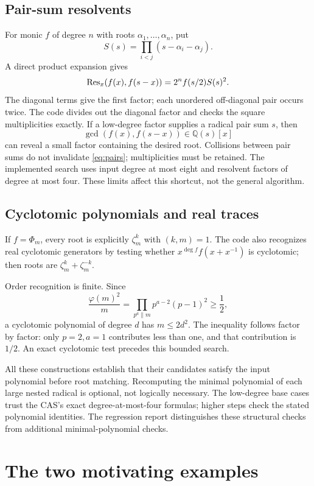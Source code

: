 \documentclass[11pt,a4paper]{article}
\theoremstyle{definition}\newtheorem{definition}[theorem]{Definition}
\theoremstyle{remark}\newtheorem{remark}[theorem]{Remark}
\newcommand{\Q}{\mathbb Q}\newcommand{\C}{\mathbb C}
\begin{document}
\subsection{Pair-sum resolvents}
For monic $f$ of degree $n$ with roots $\alpha_1,\ldots,\alpha_n$, put
\[
 S(s)=\prod_{i<j}(s-\alpha_i-\alpha_j).
\]
A direct product expansion gives
\begin{equation}\label{eq:pairs}
 \operatorname{Res}_x(f(x),f(s-x))=2^n f(s/2)S(s)^2.
\end{equation}
The diagonal terms give the first factor; each unordered off-diagonal pair
occurs twice. The code divides out the diagonal factor and checks the square
multiplicities exactly. If a low-degree factor supplies a radical pair sum
$s$, then
\[
 \gcd(f(x),f(s-x))\in\Q(s)[x]
\]
can reveal a small factor containing the desired root. Collisions between
pair sums do not invalidate \eqref{eq:pairs}; multiplicities must be retained.
The implemented search uses input degree at most eight and resolvent factors
of degree at most four. These limits affect this shortcut, not the general
algorithm.

\subsection{Cyclotomic polynomials and real traces}
If $f=\Phi_m$, every root is explicitly $\zeta_m^k$ with $(k,m)=1$. The
code also recognizes real cyclotomic generators by testing whether
$x^{\deg f}f(x+x^{-1})$ is cyclotomic; then roots are
$\zeta_m^k+\zeta_m^{-k}$.

Order recognition is finite. Since
\[
 \frac{\varphi(m)^2}{m}
 =\prod_{p^a\parallel m}p^{a-2}(p-1)^2\ge\frac12,
\]
a cyclotomic polynomial of degree $d$ has $m\le2d^2$. The inequality follows
factor by factor: only $p=2,a=1$ contributes less than one, and that
contribution is $1/2$. An exact cyclotomic test precedes this bounded search.

All these constructions establish that their candidates satisfy the input
polynomial before root matching. Recomputing the minimal polynomial of each
large nested radical is optional, not logically necessary. The low-degree
base cases trust the CAS's exact degree-at-most-four formulas; higher steps
check the stated polynomial identities. The regression report distinguishes
these structural checks from additional minimal-polynomial checks.

\section{The two motivating examples}
\end{document}
